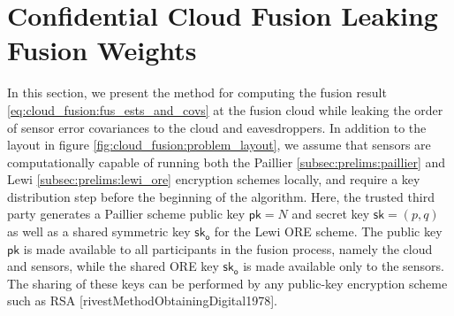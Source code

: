 % 
%                                                                               
%                                                                               
%                                                                               
% 

\section{Confidential Cloud Fusion Leaking Fusion Weights}\label{sec:cloud_fusion:fusion_with_leakage}
In this section, we present the method for computing the fusion result \eqref{eq:cloud_fusion:fus_ests_and_covs} at the fusion cloud while leaking the order of sensor error covariances to the cloud and eavesdroppers. In addition to the layout in figure \ref{fig:cloud_fusion:problem_layout}, we assume that sensors are computationally capable of running both the Paillier \ref{subsec:prelims:paillier} and Lewi \ref{subsec:prelims:lewi_ore} encryption schemes locally, and require a key distribution step before the beginning of the algorithm. Here, the trusted third party generates a Paillier scheme public key $\mathsf{pk}=N$ and secret key $\mathsf{sk}=(p,q)$ as well as a shared symmetric key $\mathsf{sk}_{\mathsf{o}}$ for the Lewi ORE scheme. The public key $\mathsf{pk}$ is made available to all participants in the fusion process, namely the cloud and sensors, while the shared ORE key $\mathsf{sk}_{\mathsf{o}}$ is made available only to the sensors. The sharing of these keys can be performed by any public-key encryption scheme such as RSA [rivestMethodObtainingDigital1978].


